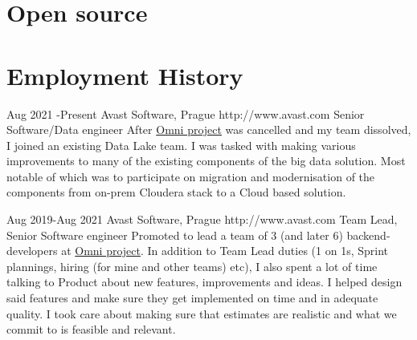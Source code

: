\documentclass[10pt]{article} %
\begin{document}

\section{Open source}


\section{Employment History}

\job
{Aug 2021 -}{Present}
{Avast Software, Prague}
{http://www.avast.com}
{Senior Software/Data engineer}
{After \href{https://www.avast.com/en-us/omni}{Omni project} was cancelled and my team dissolved, I joined an existing Data Lake team. I was tasked with making various improvements
to many of the existing components of the big data solution. Most notable of which was to participate on migration and modernisation of the components from on-prem Cloudera stack to a Cloud based solution.\\

}


\job
{Aug 2019-}{Aug 2021}
{Avast Software, Prague}
{http://www.avast.com}
{Team Lead, Senior Software engineer}
{Promoted to lead a team of 3 (and later 6) backend-developers at \href{https://www.avast.com/en-us/omni}{Omni project}. In addition to Team Lead duties (1 on 1s, Sprint plannings, hiring (for mine and other teams) etc), I also spent a lot of time
talking to Product about new features, improvements and ideas. I helped design said features and make sure they get implemented on time and in adequate quality. I took care about making sure that
estimates are realistic and what we commit to is feasible and relevant. \\

}
\end{document}
